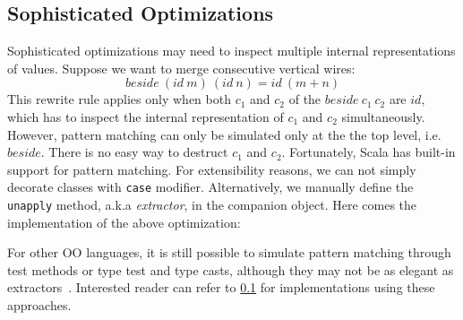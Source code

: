 \subsection{Sophisticated Optimizations}
Sophisticated optimizations may need to inspect multiple internal
representations of values.
Suppose we want to merge consecutive vertical wires:
$$
beside\ (id\ m)\ (id\ n) = id\ (m + n)
$$
This rewrite rule applies only when both $c_1$ and $c_2$ of the $beside\ c_1\ c_2$
are $id$, which has to inspect the internal representation of $c_1$ and $c_2$ simultaneously.
However, pattern matching can only be simulated only at the the top level, i.e. $beside$.
There is no easy way to destruct $c_1$ and $c_2$.
Fortunately, Scala has built-in support for pattern matching. For extensibility reasons, we
can not simply decorate classes with \lstinline{case} modifier.
Alternatively, we manually define the \lstinline{unapply} method, a.k.a \emph{extractor}, in the companion object. Here comes the implementation
of the above optimization:

For other OO languages, it is still possible to simulate
pattern matching through test methods or type test and type casts,
although they may not be as elegant as extractors~\cite{emir2007matching}.
Interested reader can refer to \ref{} for implementations using these approaches.

